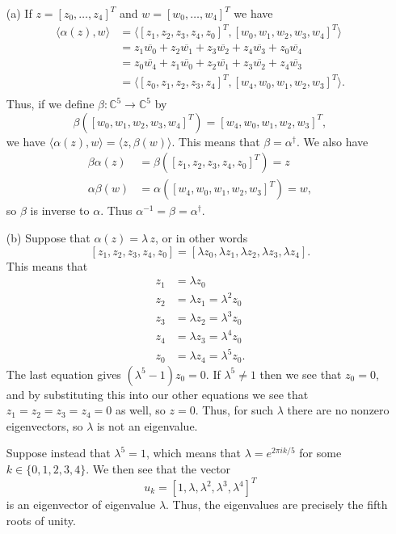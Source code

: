 \documentclass{amsart}
\newcommand{\C}         {{\mathbb{C}}}
\newcommand{\al}        {\alpha}
\newcommand{\bt}        {\beta}
\newcommand{\lm}        {\lambda}
\newcommand{\ip}[1]     {\langle #1\rangle}
\newcommand{\ov}[1]     {\overline{#1}}
\renewcommand{\:}       {\colon}
\theoremstyle{definition}
\renewenvironment{solution}{\SolutionAtEnd}{\endSolutionAtEnd}
\begin{document}
\begin{solution}
 \begin{itemize}
  \item[(a)] If $z=[z_0,\dotsc,z_4]^T$ and $w=[w_0,\dotsc,w_4]^T$ we
   have 
   \begin{align*}
    \ip{\al(z),w} &= 
     \ip{[z_1,z_2,z_3,z_4,z_0]^T,[w_0,w_1,w_2,w_3,w_4]^T} \\
    &= z_1\ov{w_0} + z_2\ov{w_1} + z_3\ov{w_2} + z_4\ov{w_3} + z_0\ov{w_4} \\
    &= z_0\ov{w_4} + z_1\ov{w_0} + z_2\ov{w_1} + z_3\ov{w_2} + z_4\ov{w_3} \\
    &= \ip{[z_0,z_1,z_2,z_3,z_4]^T,[w_4,w_0,w_1,w_2,w_3]^T}. \\
   \end{align*}
   Thus, if we define $\bt\:\C^5\to\C^5$ by 
   \[ \bt([w_0,w_1,w_2,w_3,w_4]^T) = [w_4,w_0,w_1,w_2,w_3]^T, \]
   we have $\ip{\al(z),w}=\ip{z,\bt(w)}$.  This means that
   $\bt=\al^\dag$.  We also have
   \begin{align*}
    \bt\al(z) &= \bt([z_1,z_2,z_3,z_4,z_0]^T) = z \\
    \al\bt(w) &= \al([w_4,w_0,w_1,w_2,w_3]^T) = w,
   \end{align*}
   so $\bt$ is inverse to $\al$.  Thus $\al^{-1}=\bt=\al^\dag$.
  \item[(b)] Suppose that $\al(z)=\lm\,z$, or in other words 
   \[ [z_1,z_2,z_3,z_4,z_0] =
       [\lm z_0,\lm z_1,\lm z_2,\lm z_3,\lm z_4].
   \]
   This means that
   \begin{align*}
    z_1 &= \lm z_0 \\
    z_2 &= \lm z_1 = \lm^2 z_0 \\
    z_3 &= \lm z_2 = \lm^3 z_0 \\
    z_4 &= \lm z_3 = \lm^4 z_0 \\
    z_0 &= \lm z_4 = \lm^5 z_0.
   \end{align*}
   The last equation gives $(\lm^5-1)z_0=0$.  If $\lm^5\neq 1$ then we
   see that $z_0=0$, and by substituting this into our other
   equations we see that $z_1=z_2=z_3=z_4=0$ as well, so $z=0$.  Thus,
   for such $\lm$ there are no nonzero eigenvectors, so $\lm$ is not
   an eigenvalue.  

   Suppose instead that $\lm^5=1$, which means that $\lm=e^{2\pi
    ik/5}$ for some $k\in\{0,1,2,3,4\}$.  We then see that the vector 
   \[ u_k = [1,\lm,\lm^2,\lm^3,\lm^4]^T \]
   is an eigenvector of eigenvalue $\lm$.  Thus, the eigenvalues are
   precisely the fifth roots of unity.
 \end{itemize}
\end{solution}
\end{document}
